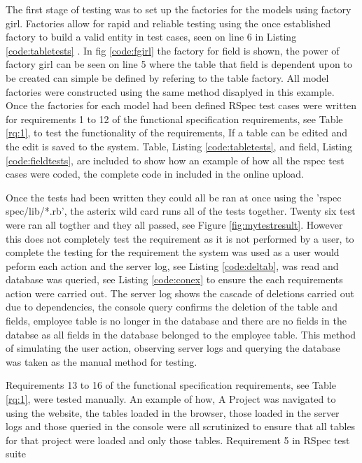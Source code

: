 \documentclass[a4paper,12pt]{article}
\begin{document}
\par The first stage of testing was to set up the factories for the models using factory girl\cite{fgirl}. Factories allow for rapid and reliable testing using the once established factory to build a valid entity in test cases, seen on line 6 in Listing \ref{code:tabletests} . In fig \ref{code:fgirl} the factory for field is shown, the power of factory girl can be seen on line 5 where the table that field is dependent upon to be created can simple be defined by refering to the table factory. All model factories were constructed using the same method disaplyed in this example. Once the factories for each model had been defined RSpec test cases were written for requirements 1 to 12 of the functional specification requirements, see Table \ref{rq:1}, to test the functionality of the requirements, If a table can be edited and the edit is saved to the system. Table,  Listing \ref{code:tabletests}, and field, Listing \ref{code:fieldtests}, are included to show how an example of how all the rspec test cases were coded, the complete code in included in the online upload.
\par Once the tests had been written they could all be ran at once using the 'rspec spec/lib/*.rb', the asterix wild card runs all of the tests together. Twenty six test were ran all togther and they all passed, see Figure \ref{fig:mytestresult}. However this does not completely test the requirement as it is not performed by a user, to complete the testing for the requirement the system was used as a user would peform each action and the server log, see Listing \ref{code:deltab}, was read and database was queried, see Listing \ref{code:conex} to ensure the each requirements action were carried out. The server log shows the cascade of deletions carried out due to dependencies, the console query confirms the deletion of the table and fields, employee table is no longer in the database and there are no fields in the databse as all fields in the database belonged to the employee table. This method of simulating the user action, observing server logs and querying the database was taken as the manual method for testing.
\par  Requirements 13 to 16 of the functional specification requirements, see Table \ref{rq:1}, were tested manually. An example of how, A Project was navigated to using the website, the tables loaded in the browser, those loaded in the server logs and those queried in the console were all scrutinized to ensure that all tables for that project were loaded and only those tables. Requirement 5 in RSpec test suite 
\end{document}
